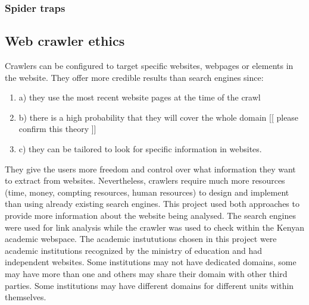 \subsubsection{Spider traps}
\subsection{Web crawler ethics}
Crawlers can be configured to target specific websites, webpages or elements in the website. They offer more credible results than search engines since:
\begin{enumerate}
\item a) they use the most recent website pages at the time of the crawl
\item b) there is a high probability that they will cover the whole domain [[ please confirm this theory ]]
\item c) they can be tailored to look for specific information in websites.
\end{enumerate}
They give the users more freedom and control over what information they want to extract from
websites. Nevertheless, crawlers require much more resources (time, money, compting resources,
human resources) to design and implement than using already existing search engines.
This project used both approaches to provide more information about the website being analysed.
The search engines were used for link analysis while the crawler was used to check within the
Kenyan academic webspace.
The academic instututions chosen in this project were academic institutions recognized by the
ministry of education and had independent websites. Some institutions may not have dedicated
domains, some may have more than one and others may share their domain with other third
parties. Some institutions may have different domains for different units within themselves.

